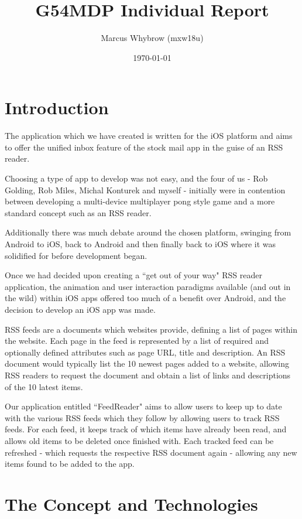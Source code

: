 \documentclass[a4paper,11pt]{article}
\title{G54MDP Individual Report}
\author{Marcus Whybrow (mxw18u)} \date{\today}
\begin{document}
	\maketitle
	
	\section{Introduction}
	
	The application which we have created is written for the iOS platform and aims to offer the unified inbox feature of the stock mail app in the guise of an RSS reader.
	
	Choosing a type of app to develop was not easy, and the four of us - Rob Golding, Rob Miles, Michal Konturek and myself - initially were in contention between developing a multi-device multiplayer pong style game and a more standard concept such as an RSS reader.
	
	Additionally there was much debate around the chosen platform, swinging from Android to iOS, back to Android and then finally back to iOS where it was solidified for before development began.
	
	Once we had decided upon creating a ``get out of your way" RSS reader application, the animation and user interaction paradigms available (and out in the wild) within iOS apps offered too much of a benefit over Android, and the decision to develop an iOS app was made.
	
	RSS feeds are a documents which websites provide, defining a list of pages within the website. Each page in the feed is represented by a list of required and optionally defined attributes such as page URL, title and description. An RSS document would typically list the 10 newest pages added to a website, allowing RSS readers to request the document and obtain a list of links and descriptions of the 10 latest items.
	
	Our application entitled ``FeedReader" aims to allow users to keep up to date with the various RSS feeds which they follow by allowing users to track RSS feeds. For each feed, it keeps track of which items have already been read, and allows old items to be deleted once finished with. Each tracked feed can be refreshed - which requests the respective RSS document again - allowing any new items found to be added to the app.
	
	\section{The Concept and Technologies}
	
\end{document}
